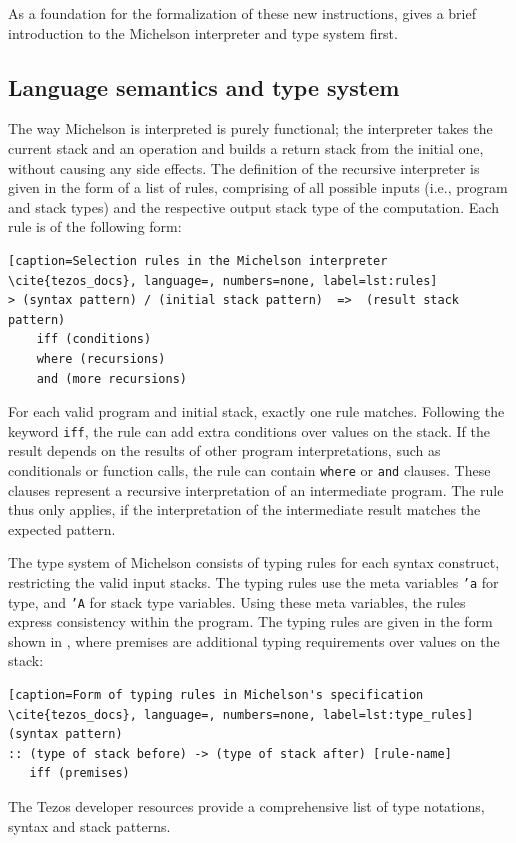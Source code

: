 As a foundation for the formalization of these new instructions,  gives a brief introduction to the Michelson interpreter and type system first.  

\subsection{Language semantics and type system}\label{sec:michelson_semantics}
The way Michelson is interpreted is purely functional; the interpreter takes the current stack and an operation and builds a return stack from the initial one, without causing any side effects. The definition of the recursive interpreter is given in the form of a list of rules, comprising of all possible inputs (i.e., program and stack types) and the respective output stack type of the computation. Each rule is of the following form: 
\begin{lstlisting}[caption=Selection rules in the Michelson interpreter \cite{tezos_docs}, language=, numbers=none, label=lst:rules]
> (syntax pattern) / (initial stack pattern)  =>  (result stack pattern)
    iff (conditions)
    where (recursions)
    and (more recursions)
\end{lstlisting}
For each valid program and initial stack, exactly one rule matches. Following the keyword \texttt{iff}, the rule can add extra conditions over values on the stack. If the result depends on the results of other program interpretations, such as conditionals or function calls, the rule can contain \texttt{where} or \texttt{and} clauses. These clauses represent a recursive interpretation of an intermediate program. The rule thus only applies, if the interpretation of the intermediate result matches the expected pattern.

The type system of Michelson consists of typing rules for each syntax construct, restricting the valid input stacks. The typing rules use the meta variables \texttt{'a} for type, and \texttt{'A} for stack type variables. Using these meta variables, the rules express consistency within the program. The typing rules are given in the form shown in , where premises are additional typing requirements over values on the stack:
\begin{lstlisting}[caption=Form of typing rules in Michelson's specification \cite{tezos_docs}, language=, numbers=none, label=lst:type_rules]
(syntax pattern)
:: (type of stack before) -> (type of stack after) [rule-name]
   iff (premises)
\end{lstlisting}
The Tezos developer resources \cite{tezos_docs} provide a comprehensive list of type notations, syntax and stack patterns.

